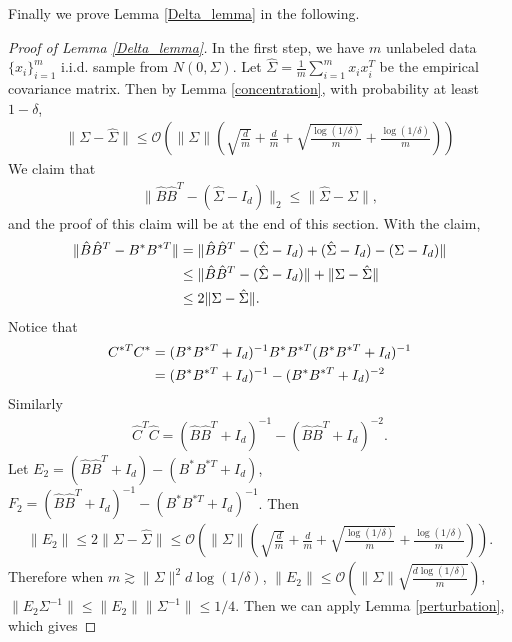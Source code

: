 Finally we prove Lemma \ref{Delta_lemma} in the following.
\begin{proof}[Proof of Lemma \ref{Delta_lemma}]
In the first step, we have $m$ unlabeled data $\{x_{i}\}_{i=1}^{m}$ i.i.d. sample from $N (0,\Sigma)$. Let $\hat{\Sigma}=\frac{1}{m}\sum_{i=1}^{m}x_{i}x_{i}^{T}$ be the empirical covariance matrix. Then by Lemma \ref{concentration}, with probability at least $1-\delta$, 
\begin{align}
\|\Sigma- \hat{\Sigma}\| \leq \mathcal{O}(\|\Sigma\|(\sqrt{\frac{d}{m}}+\frac{d}{m}+ \sqrt{\frac{\log (1/\delta)}{m}} + \frac{\log (1/\delta)}{m}))    
\end{align}
We claim that
\begin{align}\label{claim_rankk_approx}
\|\hat{B}\hat{B}^{T} - (\hat{\Sigma}-I_{d})\|_{2} \leq \|\hat{\Sigma}-\Sigma\|,   
\end{align}
and the proof of this claim will be at the end of this section.
With the claim,
\begin{align}
\|\hat{B}\hat{B}^{T} - B^{*}B^{* T}\| &= \|\hat{B}\hat{B}^{T} - (\hat{\Sigma}-I_{d}) + (\hat{\Sigma}-I_{d}) - (\Sigma - I_{d})\|  \notag \\
& \leq \|\hat{B}\hat{B}^{T} - (\hat{\Sigma}-I_{d})\| + \|\Sigma - \hat{\Sigma}\| \notag \\
& \leq 2\|\Sigma-\hat{\Sigma}\|.
\end{align}
Notice that
\begin{align}
C^{* T}C^{*} &= (B^{*}B^{* T} + I_{d})^{-1} B^{*}B^{* T}   (B^{*}B^{* T} + I_{d})^{-1} \notag \\
&= (B^{*}B^{* T} + I_{d})^{-1} - (B^{*}B^{* T} + I_{d})^{-2}
\end{align}
Similarly
\begin{align}
\hat{C}^{T}\hat{C} = (\hat{B}\hat{B}^{T} + I_{d})^{-1} - (\hat{B}\hat{B}^{T} + I_{d})^{-2}.
\end{align}
Let $E_{2}=(\hat{B}\hat{B}^{T} + I_{d}) - (B^{*}B^{* T} + I_{d})$, $F_{2} = (\hat{B}\hat{B}^{T} + I_{d})^{-1} - (B^{*}B^{* T} + I_{d})^{-1}$. Then 
\begin{align}
\|E_{2}\| \leq 2\|\Sigma-\hat{\Sigma}\| \leq \mathcal{O}(\|\Sigma\|(\sqrt{\frac{d}{m}}+\frac{d}{m}+ \sqrt{\frac{\log (1/\delta)}{m}} + \frac{\log (1/\delta)}{m})).
\end{align}
Therefore when $m \gtrsim \|\Sigma\|^{2} d \log (1/\delta)$, $\|E_{2}\| \leq \mathcal{O}(\|\Sigma\|\sqrt{\frac{d \log (1/\delta)}{m}})$, $\|E_{2}\Sigma^{-1}\| \leq \|E_{2}\|\|\Sigma^{-1}\| \leq 1/4$. Then we can apply Lemma \ref{perturbation}, which gives 

\end{proof}
